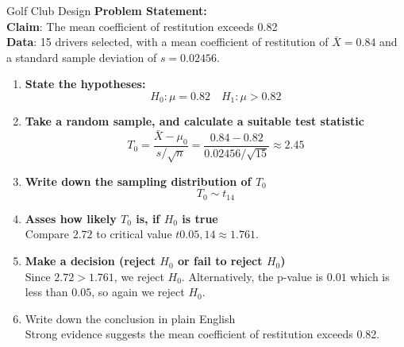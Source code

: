 \documentclass[9pt]{extarticle}
\begin{document}
\begin{examplebox}{Golf Club Design}{}
    \scriptsize\textbf{Problem Statement:}\\
    \textbf{Claim}: The mean coefficient of restitution exceeds 0.82\\
    \textbf{Data}: 15 drivers selected, with a mean coefficient of restitution of $\bar{X} =0.84$ and a standard sample deviation of $s = 0.02456$.\\[2ex]

    \begin{enumerate}
        \item \textbf{State the hypotheses:}
        $$H_0: \mu = 0.82 \quad H_1: \mu > 0.82$$
        \item \textbf{Take a random sample, and calculate a suitable test statistic}
        $$T_0 = \frac{\bar{X} - \mu_0}{s/\sqrt{n}} = \frac{0.84 - 0.82}{0.02456/\sqrt{15}} \approx 2.45$$
        \item \textbf{Write down the sampling distribution of $T_0$}
        $$T_0 \sim t_{14}$$
        \item \textbf{Asses how likely $T_0$ is, if $H_0$ is true} \\
        Compare $2.72$ to critical value $t{0.05, 14} \approx 1.761$. 
        \item \textbf{Make a decision (reject $H_0$ or fail to reject $H_0$)} \\
        Since $2.72 > 1.761$, we reject $H_0$. Alternatively, the p-value is $0.01$ which is less than $0.05$, so again we reject $H_0$. 
        \item Write down the conclusion in plain English \\
        Strong evidence suggests the mean coefficient of restitution exceeds 0.82.
    \end{enumerate}
\end{examplebox}
\end{document}
